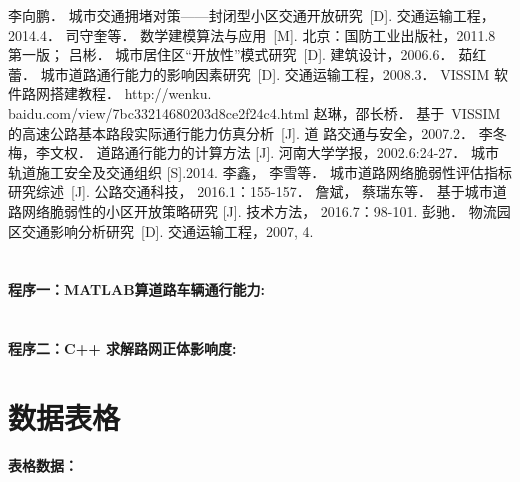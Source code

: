 \begin{thebibliography}{99}
 李向鹏． 城市交通拥堵对策——封闭型小区交通开放研究~[D]. 交通运输工程，
2014.4．
 司守奎等． 数学建模算法与应用~[M]. 北京：国防工业出版社，2011.8 第一版；
 吕彬． 城市居住区“开放性”模式研究~[D]. 建筑设计，2006.6．
 茹红蕾． 城市道路通行能力的影响因素研究~[D]. 交通运输工程，2008.3．
 VISSIM 软件路网搭建教程．
http://wenku. baidu.com/view/7bc33214680203d8ce2f24c4.html
 赵琳，邵长桥． 基于~VISSIM 的高速公路基本路段实际通行能力仿真分析~[J]. 道
路交通与安全，2007.2．
 李冬梅，李文权． 道路通行能力的计算方法 [J]. 河南大学学报，2002.6:24-27．
 城市轨道施工安全及交通组织 [S].2014.
 李鑫， 李雪等． 城市道路网络脆弱性评估指标研究综述~[J]. 公路交通科技，
2016.1：155-157．
 詹斌， 蔡瑞东等． 基于城市道路网络脆弱性的小区开放策略研究 [J]. 技术方法，
2016.7：98-101.
 彭驰． 物流园区交通影响分析研究~[D]. 交通运输工程，2007, 4.

\end{thebibliography}
\newpage

\begin{appendices}

\section*{}

\textbf{\textcolor[rgb]{0.98,0.00,0.00}{程序一：MATLAB算道路车辆通行能力:}}


\section*{}

\textcolor[rgb]{0.98,0.00,0.00}{\textbf{程序二：C++ 求解路网正体影响度:}}


\newpage
\section*{数据表格}
\textcolor[rgb]{0.98,0.00,0.00}{\textbf{表格数据：}}


\end{appendices}

